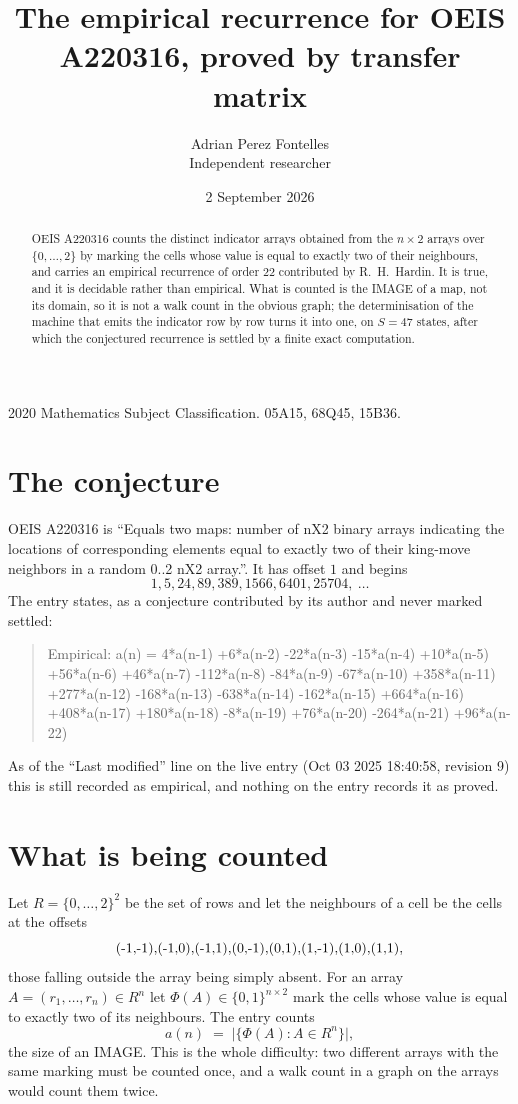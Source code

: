 \documentclass[11pt,a4paper]{article}
\title{The empirical recurrence for OEIS A220316, proved by transfer matrix}
\author{Adrian Perez Fontelles\\ \small Independent researcher}
\date{2 September 2026}
\theoremstyle{plain}
\theoremstyle{definition}
\begin{document}
\maketitle

\begin{abstract}
OEIS A220316 counts the distinct indicator arrays obtained from the $n\times2$ arrays over
$\{0,\dots,2\}$ by marking the cells whose value is equal to exactly two of their neighbours, and carries an
empirical recurrence of order $22$ contributed by R.~H.~Hardin. It is true, and it is
decidable rather than empirical. What is counted is the IMAGE of a map, not its domain, so it
is not a walk count in the obvious graph; the determinisation of the machine that emits the
indicator row by row turns it into one, on $S=47$ states, after which the conjectured
recurrence is settled by a finite exact computation.
\end{abstract}

\noindent\small 2020 Mathematics Subject Classification. 05A15, 68Q45, 15B36.\normalsize

\section{The conjecture}

OEIS A220316 is ``Equals two maps: number of nX2 binary arrays indicating the locations of corresponding elements equal to exactly two of their king-move neighbors in a random 0..2 nX2 array.''. It has offset $1$ and begins
\[
1, 5, 24, 89, 389, 1566, 6401, 25704,\ \dots
\]
The entry states, as a conjecture contributed by its author and never marked settled:
\begin{quote}
Empirical: a(n) = 4*a(n-1) +6*a(n-2) -22*a(n-3) -15*a(n-4) +10*a(n-5) +56*a(n-6) +46*a(n-7) -112*a(n-8) -84*a(n-9) -67*a(n-10) +358*a(n-11) +277*a(n-12) -168*a(n-13) -638*a(n-14) -162*a(n-15) +664*a(n-16) +408*a(n-17) +180*a(n-18) -8*a(n-19) +76*a(n-20) -264*a(n-21) +96*a(n-22)
\end{quote}
As of the ``Last modified'' line on the live entry (Oct 03 2025 18:40:58, revision 9) this is still
recorded as empirical, and nothing on the entry records it as proved.

\section{What is being counted}

Let $R=\{0,\dots,2\}^{2}$ be the set of rows and let the neighbours of a cell be the
cells at the offsets
\[
$(-1,-1)$, $(-1,0)$, $(-1,1)$, $(0,-1)$, $(0,1)$, $(1,-1)$, $(1,0)$, $(1,1)$,
\]
those falling outside the array being simply absent. For an array
$A=(r_1,\dots,r_n)\in R^n$ let $\Phi(A)\in\{0,1\}^{n\times2}$ mark the cells whose value
is equal to exactly two of its neighbours. The entry counts
\[
a(n)\;=\;\bigl|\{\Phi(A):A\in R^n\}\bigr| ,
\]
the size of an IMAGE. This is the whole difficulty: two different arrays with the same marking
must be counted once, and a walk count in a graph on the arrays would count them twice.
\end{document}
